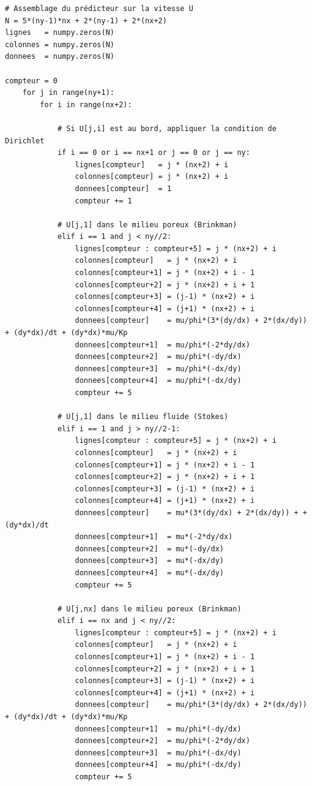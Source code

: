 \begin{verbatim}
# Assemblage du prédicteur sur la vitesse U
N = 5*(ny-1)*nx + 2*(ny-1) + 2*(nx+2)
lignes   = numpy.zeros(N)
colonnes = numpy.zeros(N)
donnees  = numpy.zeros(N)

compteur = 0
    for j in range(ny+1):
        for i in range(nx+2):
        
            # Si U[j,i] est au bord, appliquer la condition de Dirichlet
            if i == 0 or i == nx+1 or j == 0 or j == ny:
                lignes[compteur]   = j * (nx+2) + i
                colonnes[compteur] = j * (nx+2) + i
                donnees[compteur]  = 1
                compteur += 1
            
            # U[j,1] dans le milieu poreux (Brinkman)
            elif i == 1 and j < ny//2:
                lignes[compteur : compteur+5] = j * (nx+2) + i
                colonnes[compteur]   = j * (nx+2) + i
                colonnes[compteur+1] = j * (nx+2) + i - 1
                colonnes[compteur+2] = j * (nx+2) + i + 1
                colonnes[compteur+3] = (j-1) * (nx+2) + i
                colonnes[compteur+4] = (j+1) * (nx+2) + i
                donnees[compteur]    = mu/phi*(3*(dy/dx) + 2*(dx/dy)) + (dy*dx)/dt + (dy*dx)*mu/Kp
                donnees[compteur+1]  = mu/phi*(-2*dy/dx)
                donnees[compteur+2]  = mu/phi*(-dy/dx)
                donnees[compteur+3]  = mu/phi*(-dx/dy)
                donnees[compteur+4]  = mu/phi*(-dx/dy)
                compteur += 5
        
            # U[j,1] dans le milieu fluide (Stokes)
            elif i == 1 and j > ny//2-1:
                lignes[compteur : compteur+5] = j * (nx+2) + i
                colonnes[compteur]   = j * (nx+2) + i
                colonnes[compteur+1] = j * (nx+2) + i - 1
                colonnes[compteur+2] = j * (nx+2) + i + 1
                colonnes[compteur+3] = (j-1) * (nx+2) + i
                colonnes[compteur+4] = (j+1) * (nx+2) + i
                donnees[compteur]    = mu*(3*(dy/dx) + 2*(dx/dy)) + + (dy*dx)/dt
                donnees[compteur+1]  = mu*(-2*dy/dx)
                donnees[compteur+2]  = mu*(-dy/dx)
                donnees[compteur+3]  = mu*(-dx/dy)
                donnees[compteur+4]  = mu*(-dx/dy)
                compteur += 5
            
            # U[j,nx] dans le milieu poreux (Brinkman)
            elif i == nx and j < ny//2:
                lignes[compteur : compteur+5] = j * (nx+2) + i
                colonnes[compteur]   = j * (nx+2) + i
                colonnes[compteur+1] = j * (nx+2) + i - 1
                colonnes[compteur+2] = j * (nx+2) + i + 1
                colonnes[compteur+3] = (j-1) * (nx+2) + i
                colonnes[compteur+4] = (j+1) * (nx+2) + i
                donnees[compteur]    = mu/phi*(3*(dy/dx) + 2*(dx/dy)) + (dy*dx)/dt + (dy*dx)*mu/Kp
                donnees[compteur+1]  = mu/phi*(-dy/dx)
                donnees[compteur+2]  = mu/phi*(-2*dy/dx)
                donnees[compteur+3]  = mu/phi*(-dx/dy)
                donnees[compteur+4]  = mu/phi*(-dx/dy)
                compteur += 5
        

\end{verbatim}

